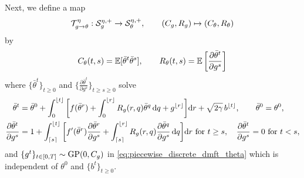 Next, we define a map
\begin{align}\label{eq:Tgthetaeta}
  \mathcal{T}_{g \to \theta}^\eta:\mathcal{S}_g^{\eta,+} \to \mathcal{S}_\theta^{\eta,+},
\qquad (C_g,R_g) \mapsto (C_\theta,R_\theta)
\end{align}
by
\[C_\theta(t,s)=\mathbb{E}[\bar\theta^t\bar\theta^s],
\qquad R_\theta(t,s)=\mathbb{E}\left[\frac{\partial \bar\theta^t}{\partial g^s}\right]\]
where $\{\bar\theta^t\}_{t \geq 0}$ and $\{\frac{\partial \bar\theta^t}{\partial
g^s}\}_{t \geq s \geq 0}$ solve
\begin{align}
\bar\theta^t&=\bar\theta^0+\int_0^{\lfloor t\rfloor}
  \bigg[f(\bar\theta^r)
    +\int_0^{\lfloor r\rfloor} R_g(r,q)
    \bar\theta^q\,\mathrm{d} q+g^{\lfloor r \rfloor}\bigg]\mathrm{d} r+\sqrt{2\gamma}\,b^{\lfloor
t\rfloor}, \qquad \bar\theta^0=\theta^0,
\label{eq:piecewise_discrete_dmft_theta}\\
\frac{\partial \bar\theta^t}{\partial g^s}
  &=1+\int_{\lceil s\rceil}^{\lfloor t\rfloor}
  \bigg[
    f'(\bar\theta^r)
    \frac{\partial \bar\theta^r}{\partial g^s}
    +\int_{\lceil s\rceil}^{\lfloor r\rfloor}
    R_g(r,q)\frac{\partial \bar\theta^q}{\partial g^s}\,\mathrm{d} q
  \bigg]\mathrm{d} r \text{ for } t \geq s,
\quad \frac{\partial \bar\theta^t}{\partial g^s}=0 \text{ for } t<s,\label{eq:piecewise_discrete_dmft_response}
\end{align}
and $\{g^t\}_{t \in [0,T]} \sim \operatorname{GP}(0,C_g)$ in
\eqref{eq:piecewise_discrete_dmft_theta} which is independent of $\theta^0$ and
$\{b^t\}_{t \geq 0}$.

